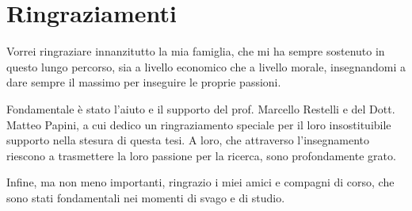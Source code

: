 \chapter*{Ringraziamenti}

\setlength\parskip{0.3em}

Vorrei ringraziare innanzitutto la mia famiglia, che mi ha sempre sostenuto in questo lungo percorso, sia a livello economico che a livello morale, insegnandomi a dare sempre il massimo per inseguire le proprie passioni.

%
Fondamentale è stato l'aiuto e il supporto del prof. Marcello Restelli e del Dott. Matteo Papini, a cui dedico un ringraziamento speciale per il loro insostituibile supporto nella stesura di questa tesi. A loro, che attraverso l'insegnamento riescono a trasmettere la loro passione per la ricerca, sono profondamente grato. 

Infine, ma non meno importanti, ringrazio i miei amici e compagni di corso, che sono stati fondamentali nei momenti di svago e di studio. 


\setlength\parindent{0cm}
\setlength\parskip{1em}